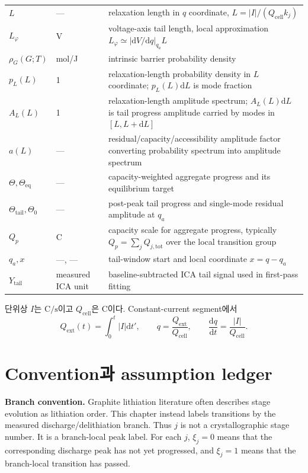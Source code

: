 \documentclass[11pt,a4paper]{article}
\newcommand{\dd}{\mathrm{d}}
\newcommand{\eq}{\mathrm{eq}}
\newcommand{\cell}{\mathrm{cell}}
\newcommand{\ext}{\mathrm{ext}}
\newcommand{\tot}{\mathrm{tot}}
\newcommand{\tail}{\mathrm{tail}}
\begin{document}
\begin{longtable}{p{} p{} p{}}
$L$ & --- & relaxation length in $q$ coordinate, $L=|I|/(Q_{\cell}k_j)$ \\
$L_\varphi$ & V & voltage-axis tail length, local approximation $L_\varphi\simeq |\dd V/\dd q|_{q_a}L$ \\
$\rho_G(G;T)$ & mol/J & intrinsic barrier probability density \\
$p_L(L)$ & 1 & relaxation-length probability density in $L$ coordinate; $p_L(L)\dd L$ is mode fraction \\
$A_L(L)$ & 1 & relaxation-length amplitude spectrum; $A_L(L)\dd L$ is tail progress amplitude carried by modes in $[L,L+\dd L]$ \\
$a(L)$ & --- & residual/capacity/accessibility amplitude factor converting probability spectrum into amplitude spectrum \\
$\Theta,\Theta_{\eq}$ & --- & capacity-weighted aggregate progress and its equilibrium target \\
$\Theta_{\tail},\Theta_0$ & --- & post-peak tail progress and single-mode residual amplitude at $q_a$ \\
$Q_p$ & C & capacity scale for aggregate progress, typically $Q_p=\sum_jQ_{j,\tot}$ over the local transition group \\
$q_a,x$ & ---, --- & tail-window start and local coordinate $x=q-q_a$ \\
$Y_{\tail}$ & measured ICA unit & baseline-subtracted ICA tail signal used in first-pass fitting \\
\bottomrule
\end{longtable}

단위상 $I$는 $\mathrm{C/s}$이고 $Q_{\cell}$은 C이다. Constant-current segment에서
\begin{equation}
Q_{\ext}(t)=\int_0^t|I|\dd t',\qquad q=\frac{Q_{\ext}}{Q_{\cell}},\qquad
\frac{\dd q}{\dd t}=\frac{|I|}{Q_{\cell}}.
\label{eq:q_time}
\end{equation}

\section{Convention과 assumption ledger}\label{sec:convention}
\textbf{Branch convention.} Graphite lithiation literature often describes stage evolution as lithiation order. This chapter instead labels
transitions by the measured discharge/delithiation branch. Thus $j$ is not a crystallographic stage number. It is a branch-local peak label.
For each $j$, $\xi_j=0$ means that the corresponding discharge peak has not yet progressed, and $\xi_j=1$ means that the branch-local
transition has passed.
\end{document}
